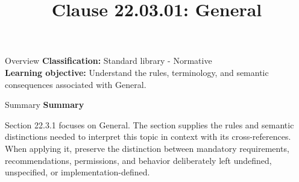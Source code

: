 \documentclass[10pt,letterpaper]{article}
\title{Clause 22.03.01: General}
\author{}
\date{}
\begin{document}
\maketitle
\begin{CornellOverviewBox}{Overview}
\textbf{Classification:} Standard library - Normative\\[2pt]
\textbf{Learning objective:} Understand the rules, terminology, and semantic consequences associated with General.
\end{CornellOverviewBox}\begin{CornellSummaryBox}{Summary}
{\sffamily\bfseries\color{Accent} Summary}\par\vspace{3pt}Section 22.3.1 focuses on General. The section supplies the rules and semantic distinctions needed to interpret this topic in context with its cross-references. When applying it, preserve the distinction between mandatory requirements, recommendations, permissions, and behavior deliberately left undefined, unspecified, or implementation-defined.
\end{CornellSummaryBox}
\end{document}
